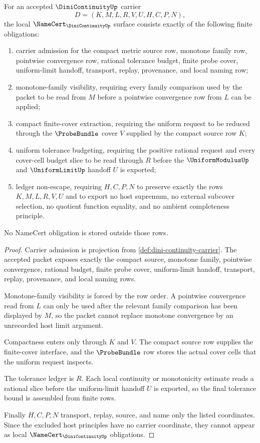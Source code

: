 \begin{theorem}
\label{thm:dini-continuity-namecert-obligation-surface}
For an accepted $\DiniContinuityUp$ carrier
$$
D=(K,M,L,R,V,U,H,C,P,N),
$$
the local $\NameCert_{\DiniContinuityUp}$ surface consists exactly of the following finite obligations:
\begin{enumerate}
\item carrier admission for the compact metric source row, monotone family row, pointwise convergence row, rational tolerance budget, finite probe cover, uniform-limit handoff, transport, replay, provenance, and local naming row;
\item monotone-family visibility, requiring every family comparison used by the packet to be read from $M$ before a pointwise convergence row from $L$ can be applied;
\item compact finite-cover extraction, requiring the uniform request to be reduced through the $\ProbeBundle$ cover $V$ supplied by the compact source row $K$;
\item uniform tolerance budgeting, requiring the positive rational request and every cover-cell budget slice to be read through $R$ before the $\UniformModulusUp$ and $\UniformLimitUp$ handoff $U$ is exported;
\item ledger non-escape, requiring $H,C,P,N$ to preserve exactly the rows $K,M,L,R,V,U$ and to export no host supremum, no external subcover selection, no quotient function equality, and no ambient completeness principle.
\end{enumerate}
No NameCert obligation is stored outside those rows.
\end{theorem}
\begin{proof}
Carrier admission is projection from \autoref{def:dini-continuity-carrier}. The accepted packet exposes exactly the compact source, monotone family, pointwise convergence, rational budget, finite probe cover, uniform-limit handoff, transport, replay, provenance, and local naming rows.

Monotone-family visibility is forced by the row order. A pointwise convergence read from $L$ can only be used after the relevant family comparison has been displayed by $M$, so the packet cannot replace monotone convergence by an unrecorded host limit argument.

Compactness enters only through $K$ and $V$. The compact source row supplies the finite-cover interface, and the $\ProbeBundle$ row stores the actual cover cells that the uniform request inspects.

The tolerance ledger is $R$. Each local continuity or monotonicity estimate reads a rational slice before the uniform-limit handoff $U$ is exported, so the final tolerance bound is assembled from finite rows.

Finally $H,C,P,N$ transport, replay, source, and name only the listed coordinates. Since the excluded host principles have no carrier coordinate, they cannot appear as local $\NameCert_{\DiniContinuityUp}$ obligations.
\end{proof}

